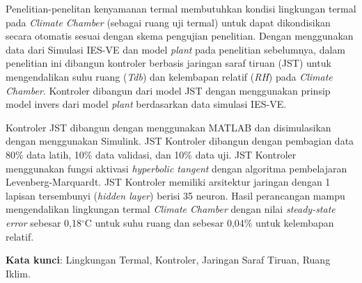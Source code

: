 Penelitian-penelitan kenyamanan termal membutuhkan kondisi lingkungan termal pada \textit{Climate Chamber} (sebagai ruang uji termal) untuk dapat dikondisikan secara otomatis sesuai dengan skema pengujian penelitian. Dengan menggunakan data dari Simulasi IES-VE\cite{skripsiIchfan} dan model \textit{plant}\cite{skripsiTanto} pada penelitian sebelumnya, dalam penelitian ini dibangun kontroler berbasis jaringan saraf tiruan (JST) untuk mengendalikan suhu ruang (\textit{Tdb}) dan kelembapan relatif (\textit{RH}) pada \textit{Climate Chamber}. Kontroler dibangun dari model JST dengan menggunakan prinsip model invers dari model \textit{plant} berdasarkan data simulasi IES-VE.

Kontroler JST dibangun dengan menggunakan MATLAB dan disimulasikan dengan menggunakan Simulink. JST Kontroler dibangun dengan pembagian data 80\% data latih, 10\% data validasi, dan 10\% data uji. JST Kontroler menggunakan fungsi aktivasi \textit{hyperbolic tangent} dengan algoritma pembelajaran Levenberg-Marquardt. JST Kontroler memiliki arsitektur jaringan dengan 1 lapisan tersembunyi (\textit{hidden layer}) berisi 35 neuron. Hasil perancangan mampu mengendalikan lingkungan termal \textit{Climate Chamber} dengan nilai \textit{steady-state error} sebesar 0,18$^\circ$C untuk suhu ruang dan sebesar 0,04\% untuk kelembapan relatif.

\vspace{0.5cm}
\hspace{-1.2cm}
\textbf{Kata kunci}: Lingkungan Termal, Kontroler, Jaringan Saraf Tiruan, Ruang Iklim.


